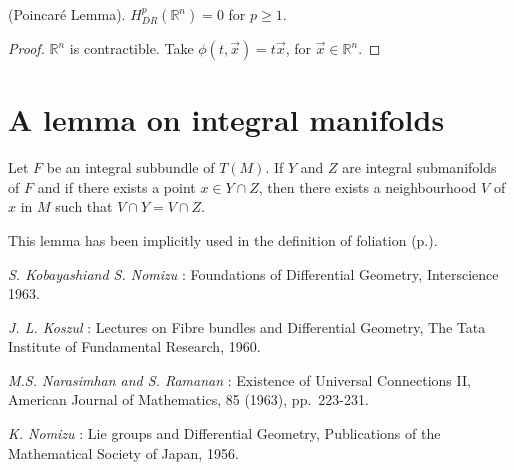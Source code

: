 \begin{coro*}
{\rm (Poincar\'e Lemma).} $H^{p}_{DR}(\mathbb{R}^{n})=0$ for $p\geq 1$.
\end{coro*}

\begin{proof}
$\mathbb{R}^{n}$ is contractible. Take $\phi(t,\overrightarrow{x})=t\overrightarrow{x}$, for $\overrightarrow{x}\in \mathbb{R}^{n}$.
\end{proof}

\section{A lemma on integral manifolds}\label{sec13-app-sec3}

Let $F$ be an integral subbundle of $T(M)$. If $Y$ and $Z$ are integral submanifolds of $F$ and if there exists a point $x\in Y\cap Z$, then there exists a neighbourhood $V$ of $x$ in $M$ such that $V\cap Y=V\cap Z$.

This lemma has been implicitly used in the definition of foliation (p.\pageref{page38}).

\begin{thebibliography}{99}
 {\em S. Kobayashi\pageoriginale and S. Nomizu} : Foundations of Differential Geometry, Interscience 1963.

 {\em J. L. Koszul} : Lectures on Fibre bundles and Differential Geometry, The Tata Institute of Fundamental Research, 1960.

 {\em M.S. Narasimhan and S. Ramanan} : Existence of Universal Connections II, American Journal of Mathematics, 85 (1963), pp.~223-231.

 {\em K. Nomizu} : Lie groups and Differential Geometry, Publications of the Mathematical Society of Japan, 1956.

\end{thebibliography}
